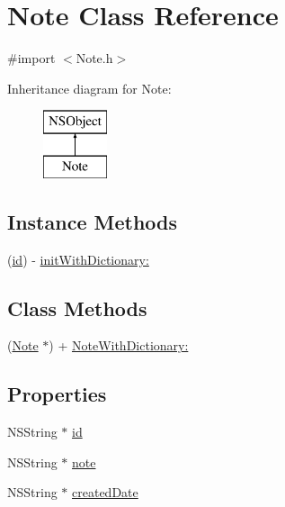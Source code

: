 \hypertarget{interface_note}{\section{Note Class Reference}
\label{interface_note}
}


{\ttfamily \#import $<$Note.\-h$>$}

Inheritance diagram for Note\-:\begin{figure}[H]
\begin{center}
\leavevmode
\includegraphics[height=2.000000cm]{interface_note}
\end{center}
\end{figure}
\subsection*{Instance Methods}
\begin{DoxyCompactItemize}
\item 
(\hyperlink{interface_note_ad060a0b99312b140563b7b065cf51101}{id}) -\/ \hyperlink{interface_note_a1006a3c75bc5f9cf277f9782f84e1ee3}{init\-With\-Dictionary\-:}
\end{DoxyCompactItemize}
\subsection*{Class Methods}
\begin{DoxyCompactItemize}
\item 
(\hyperlink{interface_note}{Note} $\ast$) + \hyperlink{interface_note_a7662139bda8b7a29e0303f444044e5b0}{Note\-With\-Dictionary\-:}
\end{DoxyCompactItemize}
\subsection*{Properties}
\begin{DoxyCompactItemize}
\item 
N\-S\-String $\ast$ \hyperlink{interface_note_ad060a0b99312b140563b7b065cf51101}{id}
\item 
N\-S\-String $\ast$ \hyperlink{interface_note_a4a5a0e45c35c48be062f46f578077ea7}{note}
\item 
N\-S\-String $\ast$ \hyperlink{interface_note_ac7abb36a7f71efef1ea545064af3aa86}{created\-Date}
\end{DoxyCompactItemize}


